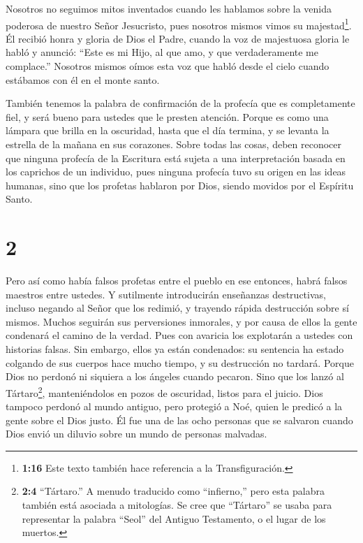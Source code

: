  Nosotros no seguimos mitos inventados cuando les hablamos
sobre la venida poderosa de nuestro Señor Jesucristo, pues nosotros
mismos vimos su majestad\footnote{\textbf{1:16} Este texto también hace
  referencia a la Transfiguración.}.  Él recibió honra y
gloria de Dios el Padre, cuando la voz de majestuosa gloria le habló y
anunció: ``Este es mi Hijo, al que amo, y que verdaderamente me
complace.''  Nosotros mismos oímos esta voz que habló desde
el cielo cuando estábamos con él en el monte santo.

 También tenemos la palabra de confirmación de la profecía
que es completamente fiel, y será bueno para ustedes que le presten
atención. Porque es como una lámpara que brilla en la oscuridad, hasta
que el día termina, y se levanta la estrella de la mañana en sus
corazones.  Sobre todas las cosas, deben reconocer que
ninguna profecía de la Escritura está sujeta a una interpretación basada
en los caprichos de un individuo,  pues ninguna profecía
tuvo su origen en las ideas humanas, sino que los profetas hablaron por
Dios, siendo movidos por el Espíritu Santo.

\hypertarget{section-1}{%
\section{2}\label{section-1}}

 Pero así como había falsos profetas entre el pueblo en ese
entonces, habrá falsos maestros entre ustedes. Y sutilmente introducirán
enseñanzas destructivas, incluso negando al Señor que los redimió, y
trayendo rápida destrucción sobre sí mismos.  Muchos
seguirán sus perversiones inmorales, y por causa de ellos la gente
condenará el camino de la verdad.  Pues con avaricia los
explotarán a ustedes con historias falsas. Sin embargo, ellos ya están
condenados: su sentencia ha estado colgando de sus cuerpos hace mucho
tiempo, y su destrucción no tardará.  Porque Dios no perdonó
ni siquiera a los ángeles cuando pecaron. Sino que los lanzó al
Tártaro\footnote{\textbf{2:4} ``Tártaro.'' A menudo traducido como
  ``infierno,'' pero esta palabra también está asociada a mitologías. Se
  cree que ``Tártaro'' se usaba para representar la palabra ``Seol'' del
  Antiguo Testamento, o el lugar de los muertos.}, manteniéndolos en
pozos de oscuridad, listos para el juicio.  Dios tampoco
perdonó al mundo antiguo, pero protegió a Noé, quien le predicó a la
gente sobre el Dios justo. Él fue una de las ocho personas que se
salvaron cuando Dios envió un diluvio sobre un mundo de personas
malvadas.


